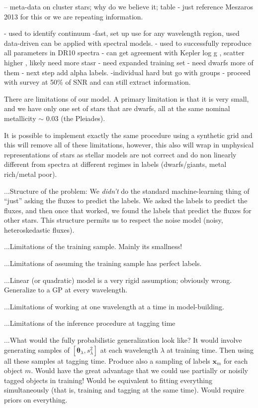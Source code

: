 \documentclass[12pt, preprint]{aastex}
\newcommand{\set}[1]{\bm{#1}}
\begin{document}
-- meta-data on cluster stars; why do we believe it; table - just reference Meszaros 2013 for this or we are repeating information. 

- used to identify continuum
-fast, set up use for any wavelength region, used data-driven can be applied with spectral models. 
- used to successfully reproduce all parameters in DR10 spectra
- can get agreement with Kepler log g , scatter higher , likely need more stasr
- need expanded training set - need dwarfs more of them
- next step add alpha labels. 
-individual hard but go with groups
- proceed with survey at 50\% of SNR and can still extract information.

There are limitations of our model. A primary limitation is that it is very small, and we have only one set of stars that are dwarfs, all at the same nominal metallicity $\sim$ 0.03 (the Pleiades). 

It is possible to implement exactly the same procedure using a synthetic grid and this will remove all of these limitations, however, this also will wrap in unphysical representations of stars as stellar models are not correct and do non linearly different from spectra at different regimes in labels (dwarfs/giants, metal rich/metal poor). 

...Structure of the problem:
We \emph{didn't} do the standard machine-learning thing of ``just'' asking the fluxes to predict the labels.
We asked the labels to predict the fluxes, and then once that worked, we found the labels that predict the fluxes for other stars.
This structure permits us to respect the noise model (noisy, heteroskedastic fluxes).

...Limitations of the training sample.  Mainly its smallness!

...Limitations of assuming the training sample has perfect labels.

...Linear (or quadratic) model is a very rigid assumption; obviously wrong.
Generalize to a GP at every wavelength.

...Limitations of working at one wavelength at a time in model-building.

...Limitations of the inference procedure at tagging time

...What would the fully probabilistic generalization look like?
It would involve generating samples of $[\set{\theta}_\lambda, s_\lambda^2]$ at each wavelength $\lambda$ at training time.
Then using all these samples at tagging time.
Produce also a sampling of labels $\set{x}_m$ for each object $m$.
Would have the great advantage that we could use partially or noisily tagged objects in training!
Would be equivalent to fitting everything simultaneously (that is, training and tagging at the same time).
Would require priors on everything.
\end{document}
